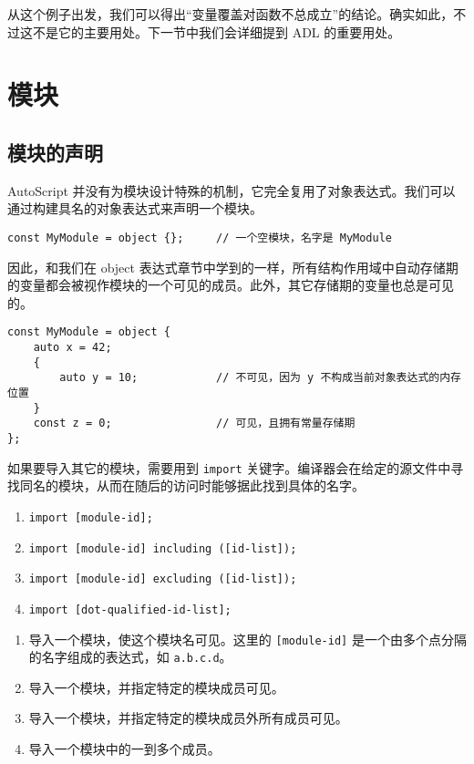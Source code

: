 从这个例子出发，我们可以得出“变量覆盖对函数不总成立”的结论。确实如此，不过这不是它的主要用处。下一节中我们会详细提到 ADL 的重要用处。

\section{模块}

\subsection{模块的声明}

AutoScript 并没有为模块设计特殊的机制，它完全复用了对象表达式。我们可以通过构建具名的对象表达式来声明一个模块。

\begin{lstlisting}
const MyModule = object {};		// 一个空模块，名字是 MyModule
\end{lstlisting}

因此，和我们在 object 表达式章节中学到的一样，所有结构作用域中自动存储期的变量都会被视作模块的一个可见的成员。此外，其它存储期的变量也总是可见的。

\begin{lstlisting}
const MyModule = object {
	auto x = 42;
	{
		auto y = 10;			// 不可见，因为 y 不构成当前对象表达式的内存位置
	}
	const z = 0;				// 可见，且拥有常量存储期
};
\end{lstlisting}

如果要导入其它的模块，需要用到 \lstinline!import! 关键字。编译器会在给定的源文件中寻找同名的模块，从而在随后的访问时能够据此找到具体的名字。

\begin{grammar} \label{grm:import-statement}
\begin{enumerate}
	\item \lstinline!import [module-id];!
	\item \lstinline!import [module-id] including ([id-list]);!
	\item \lstinline!import [module-id] excluding ([id-list]);!
	\item \lstinline!import [dot-qualified-id-list];!
\end{enumerate}
\end{grammar}

\begin{enumerate}
	\item 导入一个模块，使这个模块名可见。这里的 \lstinline![module-id]! 是一个由多个点分隔的名字组成的表达式，如 \lstinline!a.b.c.d!。
	\item 导入一个模块，并指定特定的模块成员可见。
	\item 导入一个模块，并指定特定的模块成员外所有成员可见。
	\item 导入一个模块中的一到多个成员。
\end{enumerate}

